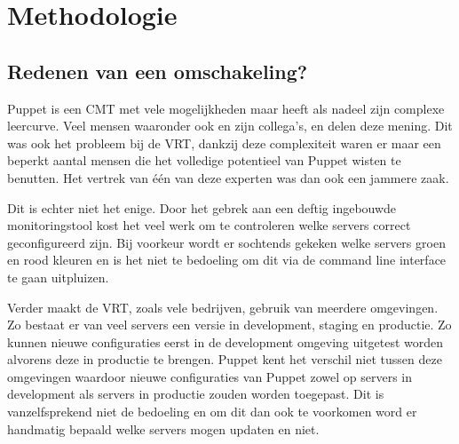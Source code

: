 
\chapter{Methodologie}
\label{ch:methodologie}


\section{Redenen van een omschakeling?}
\label{sec:methodologie-redenen-omschakeling}

Puppet is een CMT met vele mogelijkheden maar heeft als nadeel zijn complexe leercurve. Veel mensen waaronder ook \textcite{danAnsiblevsPuppet} en zijn collega's, \textcite{martinAnsiblevsPuppet} en \textcite{AliAnsiblevsPuppet} delen deze mening. Dit was ook het probleem bij de VRT, dankzij deze complexiteit waren er maar een beperkt aantal mensen die het volledige potentieel van Puppet wisten te benutten. Het vertrek van \'e\'en van deze experten was dan ook een jammere zaak.

Dit is echter niet het enige. Door het gebrek aan een deftig ingebouwde monitoringstool kost het veel werk om te controleren welke servers correct geconfigureerd zijn. Bij voorkeur wordt er sochtends gekeken welke servers groen en rood kleuren en is het niet te bedoeling om dit via de command line interface te gaan uitpluizen.

Verder maakt de VRT, zoals vele bedrijven, gebruik van meerdere omgevingen. Zo bestaat er van veel servers een versie in development, staging en productie. Zo kunnen nieuwe configuraties eerst in de development omgeving uitgetest worden alvorens deze in productie te brengen. Puppet kent het verschil niet tussen deze omgevingen waardoor nieuwe configuraties van Puppet zowel op servers in development als servers in productie zouden worden toegepast. Dit is vanzelfsprekend niet de bedoeling en om dit dan ook te voorkomen word er handmatig bepaald welke servers mogen updaten en niet. 

